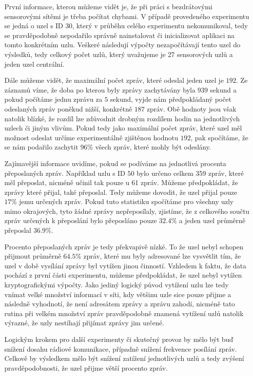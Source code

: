 \documentclass[11pt,final,twoside]{fithesis2}
\begin{document}
První informace, kterou můžeme vidět je, že při práci s bezdrátovými sensorovými sítěmi je třeba počítat chybami. V případě provedeného experimentu se jedná o uzel s ID 30, který v průběhu celého experimentu 
nekomunikoval, tedy se pravděpodobně nepodařilo správně nainstalovat či inicializovat aplikaci na tomto konkrétním uzlu. Veškeré následují výpočty nezapočítávají tento uzel do výsledků, tedy celkový počet 
uzlů, který uvažujeme je 27 sensorových uzlů a jeden uzel centrální. 

Dále můžeme vidět, že maximální počet zpráv, které odeslal jeden uzel je $192$. Ze záznamů víme, že doba po kterou byly zprávy zachytávány  byla $939$ sekund a pokud počítáme jednu 
zprávu za $5$ sekund, vyjde nám předpokládaný počet odeslaných zpráv poněkud nižší, konkrétně $187$ zpráv. Obě hodnoty jsou však natolik blízké, že rozdíl lze zdůvodnit drobným rozdílem hodin na jednotlivých 
uzlech či jiným vlivům. Pokud tedy jako maximální počet zpráv, které uzel měl možnost odeslat určíme experimentálně zjištěnou hodnotu $192$, pak spočítáme, že se nám podařilo zachytit $96\%$ všech zpráv, 
které mohly být odeslány.

Zajímavější informace uvidíme, pokud se podíváme na jednotlivá procenta přeposlaných zpráv. Například uzlu s ID $50$ bylo určeno celkem 359 zpráv, které měl přeposlat, nicméně učinil tak pouze u 61 zpráv. 
Můžeme předpokládat, že zprávy které přijal, také přeposlal. Tedy můžeme dovodit, že uzel přijal pouze $17\%$ jemu určených zpráv. Pokud tuto statistiku spočítáme pro všechny uzly mimo okrajových, tyto žádné 
zprávy nepřeposílaly, zjistíme, že z celkového součtu zpráv určených k přeposlání bylo přeposláno pouze $32.4\%$ a jeden uzel průměrně přeposlal $36.9\%$. 

Procento přeposlaných zpráv je tedy překvapivě nízké. To že uzel nebyl schopen přijmout průměrně $64.5\%$ zpráv, které mu byly adresované lze vysvětlit tím, že uzel v době vysílání zprávy byl vytížen 
jinou činností. Vzhledem k faktu, že data pochází z první části experimentu, můžeme předpokládat, že uzel nebyl vytížen kryptografickými výpočty. Jako jediný logický původ vytížení uzlu lze tedy vnímat
velké množství informací v síti, kdy většinu uzle sice pouze přijme a následně vyhodnotí, že není adresátem zprávy a zprávu zahodí, nicméně tato rutina při velkém množství zpráv pravděpodobně znamená 
vytížení uzlů natolik výrazné, že uzly nestíhají přijímat zprávy jim určené.

Logickým krokem pro další experimenty či skutečný provoz by mělo být buď snížení dosahu rádiové komunikace, případně snížení frekvence posílání zpráv. Celkově by výsledkem mělo být snížení zatížení 
jednotlivých uzlů a tedy zvýšení pravděpodobnosti, že uzel přijme větší procento zpráv.
\end{document}
